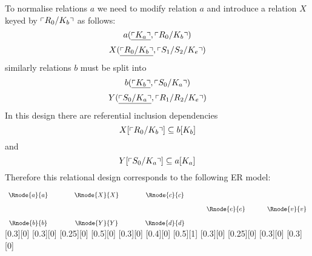To normalise relations $a$ we need to modify relation $a$ and introduce a relation $X$ keyed by $\left\ulcorner R_0/K_b\right\urcorner$ as follows:
\begin{equation}
\label{normalrelationa}
a(\underline{\left\ulcorner K_a\right\urcorner},\left\ulcorner R_0/K_b\right\urcorner)
\end{equation}
\begin{equation}
\label{relationX}
X(\underline{\left\ulcorner R_0/K_b\right\urcorner},\left\ulcorner S_1/S_2/K_e\right\urcorner)
\end{equation}
similarly relations $b$ must be split into
\begin{equation}
\label{normalrelationb}
b(\underline{\left\ulcorner K_b\right\urcorner},\left\ulcorner S_0/K_a\right\urcorner)
\end{equation}
\begin{equation}
\label{relationY}
Y(\underline{\left\ulcorner S_0/K_a\right\urcorner},\left\ulcorner R_1/R_2/K_e\right\urcorner)
\end{equation}
In this design there are referential inclusion dependencies 
\begin{equation}
X[\left\ulcorner R_0/K_b\right\urcorner] \subseteq b[K_b]
\end{equation}
and
\begin{equation}
Y[\left\ulcorner S_0/K_a\right\urcorner] \subseteq a[K_a]
\end{equation}
Therefore this relational design corresponds to the following ER model:
\vspace{0.75cm}
\begin{center}
$
\begin{array}{c p{0.75cm} c p{0.75cm}c p{0.5cm}c p{0.5cm}c}
 \Rnode{a}{a}  && \Rnode{X}{X}  && \Rnode{c}{c}  &&              &&              \\ [0.35cm]
	 	           &&               &&               && \Rnode{e}{e} && \Rnode{v}{v} \\ [0.35cm]     
 \Rnode{b}{b}  && \Rnode{Y}{Y}  && \Rnode{d}{d}  &&              &&              \\ 
\end{array}
$
[0.3][0]
\idcomp
{}
[0.3][0]
[0.25][0]
\idcomp
{} 
[0.5][0]
[0.3][0]
\idcomp
{}
[0.4][0]
\idcomp
{}
[0.5][1]
[0.3][0]
\idcomp
{}
[0.25][0]
\idcomp
{}
[0.3][0]
[0.3][0]
\idcomp
\end{center}
\vspace{1.5cm}


